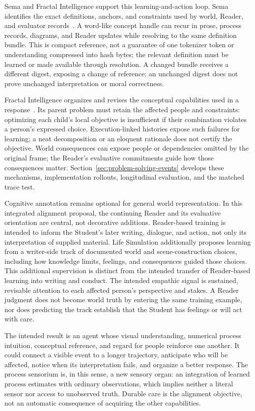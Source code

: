 \documentclass[10pt]{article}
\begin{document}
Sema and Fractal Intelligence support this learning-and-action loop.
Sema identifies the exact definitions, anchors, and constraints used by
world, Reader, and evaluator records~\cite{westerbergSema2026}. A word-like
concept handle can recur in prose, process records, diagrams, and Reader
updates while resolving to the same definition bundle. This is compact
reference, not a guarantee of one tokenizer token or understanding compressed
into hash bytes; the relevant definition must be learned or made available
through resolution. A changed bundle
receives a different digest, exposing a change of reference; an unchanged
digest does not prove unchanged interpretation or moral correctness.

Fractal Intelligence organizes and revises the conceptual capabilities used
in a response~\cite{westerbergFractal2026}. Its parent
problem must retain the affected people and constraints: optimizing each
child's local objective is insufficient if their combination violates a
person's expressed choice. Execution-linked histories expose such failures
for learning; a neat decomposition or an eloquent rationale does not certify
the objective. World
consequences can expose people or dependencies omitted by the original frame;
the Reader's evaluative commitments guide how those consequences matter.
Section~\ref{sec:problem-solving-events} develops these mechanisms,
implementation rollouts, longitudinal evaluation, and the matched trace test.

Cognitive annotation remains optional for general world representation. In
this integrated alignment proposal, the continuing Reader and its evaluative
orientation are central, not decorative additions. Reader-based training is
intended to inform the Student's later writing, dialogue, and action, not only
its interpretation of supplied material. Life Simulation additionally proposes
learning from a writer-side track of documented world and scene-construction
choices, including how knowledge limits, feelings, and consequences guided
those choices. This additional supervision is distinct from the intended
transfer of Reader-based learning into writing and conduct. The intended empathic signal
is sustained, revisable attention to each affected person's perspective and
stakes. A Reader judgment does not become world truth by entering the same
training example, nor does predicting the track establish that the Student
has feelings or will act with care.

The intended result is an agent whose visual understanding, numerical process
intuition, conceptual reference, and regard for people reinforce one another.
It could connect a visible event to a longer trajectory, anticipate who will
be affected, notice when its interpretation fails, and organize a better
response. The process sensorium is, in this sense, a new
sensory organ: an integration of learned process estimates with ordinary
observations, which implies neither a literal sensor nor access to unobserved
truth. Durable care is the alignment objective,
not an automatic consequence of acquiring the other capabilities.
\end{document}
